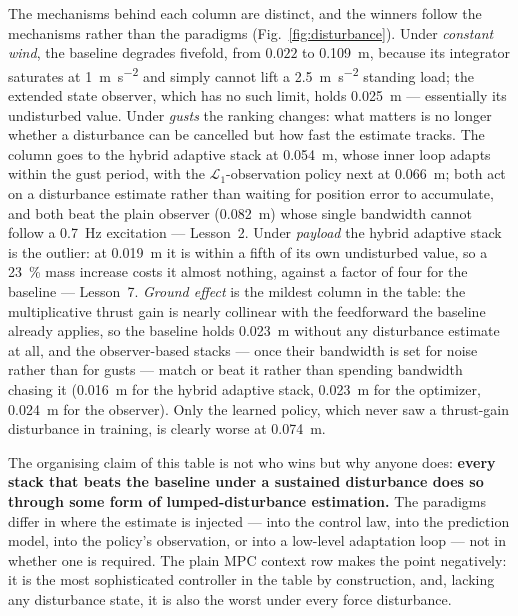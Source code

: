 The mechanisms behind each column are distinct, and the winners follow the mechanisms
rather than the paradigms (Fig.~\ref{fig:disturbance}). Under \emph{constant wind}, the baseline degrades fivefold,
from $0.022$ to \SI{0.109}{\meter}, because its integrator saturates at
\SI{1}{\meter\per\second\squared} and simply cannot lift a
\SI{2.5}{\meter\per\second\squared} standing load; the extended state observer, which
has no such limit, holds \SI{0.025}{\meter} --- essentially its undisturbed value. Under
\emph{gusts} the ranking changes: what matters is no longer whether a disturbance can be
cancelled but how fast the estimate tracks. The column goes to the hybrid adaptive stack
at \SI{0.054}{\meter}, whose inner loop adapts within the gust period, with the
$\mathcal{L}_1$-observation policy next at \SI{0.066}{\meter}; both act on a disturbance
estimate rather than waiting for position error to accumulate, and both beat the plain
observer (\SI{0.082}{\meter}) whose single bandwidth cannot follow a
\SI{0.7}{\hertz} excitation --- Lesson~2. Under \emph{payload} the hybrid
adaptive stack is the outlier: at \SI{0.019}{\meter} it is within a fifth of its own
undisturbed value, so a \SI{23}{\percent} mass increase costs it almost nothing, against
a factor of four for the baseline --- Lesson~7. \emph{Ground effect} is the mildest
column in the table: the multiplicative thrust gain is nearly collinear with the
feedforward the baseline already applies, so the baseline holds \SI{0.023}{\meter}
without any disturbance estimate at all, and the observer-based stacks --- once their
bandwidth is set for noise rather than for gusts --- match or beat it rather than
spending bandwidth chasing it (\SI{0.016}{\meter} for the hybrid adaptive stack,
\SI{0.023}{\meter} for the optimizer, \SI{0.024}{\meter} for the observer). Only the
learned policy, which never saw a thrust-gain disturbance in training, is clearly worse
at \SI{0.074}{\meter}.

The organising claim of this table is not who wins but why anyone does: \textbf{every
stack that beats the baseline under a sustained disturbance does so through some form of
lumped-disturbance estimation.} The paradigms differ in where the estimate is injected
--- into the control law, into the prediction model, into the policy's observation, or
into a low-level adaptation loop --- not in whether one is required. The plain MPC
context row makes the point negatively: it is the most sophisticated controller in the
table by construction, and, lacking any disturbance state, it is also the worst under
every force disturbance.

